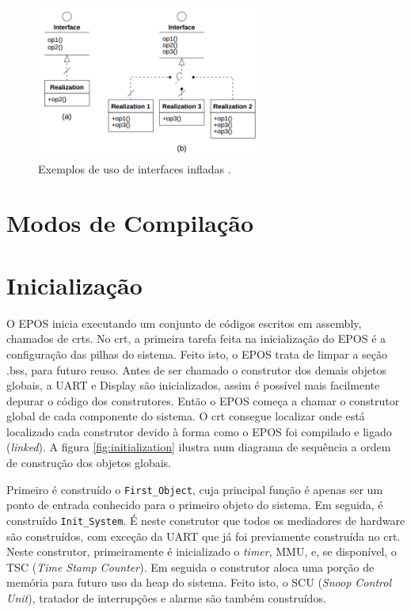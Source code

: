 \begin{figure}[ht!]
	\label{fig:inflated}
    \centering
    \includegraphics[width=7.5cm]{figuras/inflated_interface}
    \caption{Exemplos de uso de interfaces infladas \cite{guto_thesis}.}
\end{figure}




\section{Modos de Compilação}

\section{Inicialização}

O EPOS inicia executando um conjunto de códigos escritos em assembly, chamados de crts.
No crt, a primeira tarefa feita na inicialização do EPOS é a configuração das pilhas do sistema. Feito isto, o EPOS trata de limpar a seção .bss, para futuro reuso.
Antes de ser chamado o construtor dos demais objetos globais, a UART e Display são inicializados, assim é possível mais facilmente depurar o código dos construtores.
Então o EPOS começa a chamar o construtor global de cada componente do sistema. O crt consegue localizar onde está localizado cada construtor devido à forma como o EPOS foi compilado e ligado (\emph{linked}). A figura \ref{fig:initialization} ilustra num diagrama de sequência a ordem de construção dos objetos globais.


Primeiro é construído o \verb+First_Object+, cuja principal função é apenas ser um ponto de entrada conhecido para o primeiro objeto do sistema.
Em seguida, é construído \verb+Init_System+. É neste construtor que todos os mediadores de hardware são construídos, com exceção da UART que já foi previamente construída no crt. Neste construtor, primeiramente é inicializado o \emph{timer}, MMU, e, se disponível, o TSC (\emph{Time Stamp Counter}). Em seguida o construtor aloca uma porção de memória para futuro uso da heap do sistema. Feito isto, o SCU (\emph{Snoop Control Unit}), tratador de interrupções e alarme são também construídos.

